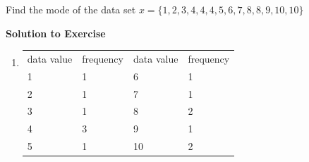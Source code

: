 \begin{description}[noitemsep]
\begin{description}[noitemsep]
{\begin{mdframed}[linewidth=4, leftmargin=40, rightmargin=40]
\begin{exercise}
          \label{m39400*probfhsst!!!underscore!!!id1504}
          \label{m39400*id212220}Find the mode of the data set $x=\{1,2,3,4,4,4,5,6,7,8,8,9,10,10\}$ \par 
          \vspace{5pt}
          \label{m39400*solfhsst!!!underscore!!!id1507}\noindent\textbf{Solution to Exercise } \label{m39400*listfhsst!!!underscore!!!id1507}\begin{enumerate}[noitemsep, label=\textbf{Step} \textbf{\arabic*}. ] 
            \leftskip=20pt\rightskip=\leftskip\item  
          \begin{table}[H]
        \begin{center}
      \label{m39400*id212318}
    \noindent
      \tablelasttail{}
      \begin{xtabular}[t]{|l|l|l|l|}\hline
        data value &
        frequency &
        data value &
        frequency%
     \tabularnewline{}
        1 &
        1 &
        6 &
        1%
     \tabularnewline{}
        2 &
        1 &
        7 &
        1%
     \tabularnewline{}
        3 &
        1 &
        8 &
        2%
     \tabularnewline{}
        4 &
        3 &
        9 &
        1%
     \tabularnewline{}
        5 &
        1 &
        10 &
        2%
     \tabularnewline{}

\end{xtabular}
\end{center}
\end{table}
\end{enumerate}
\end{exercise}
\end{mdframed}}
\end{description}
\end{description}
